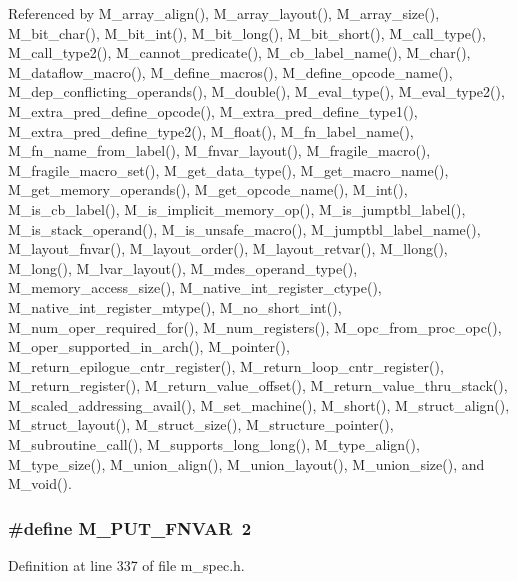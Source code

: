 Referenced by M\_\-array\_\-align(), M\_\-array\_\-layout(), M\_\-array\_\-size(), M\_\-bit\_\-char(), M\_\-bit\_\-int(), M\_\-bit\_\-long(), M\_\-bit\_\-short(), M\_\-call\_\-type(), M\_\-call\_\-type2(), M\_\-cannot\_\-predicate(), M\_\-cb\_\-label\_\-name(), M\_\-char(), M\_\-dataflow\_\-macro(), M\_\-define\_\-macros(), M\_\-define\_\-opcode\_\-name(), M\_\-dep\_\-conflicting\_\-operands(), M\_\-double(), M\_\-eval\_\-type(), M\_\-eval\_\-type2(), M\_\-extra\_\-pred\_\-define\_\-opcode(), M\_\-extra\_\-pred\_\-define\_\-type1(), M\_\-extra\_\-pred\_\-define\_\-type2(), M\_\-float(), M\_\-fn\_\-label\_\-name(), M\_\-fn\_\-name\_\-from\_\-label(), M\_\-fnvar\_\-layout(), M\_\-fragile\_\-macro(), M\_\-fragile\_\-macro\_\-set(), M\_\-get\_\-data\_\-type(), M\_\-get\_\-macro\_\-name(), M\_\-get\_\-memory\_\-operands(), M\_\-get\_\-opcode\_\-name(), M\_\-int(), M\_\-is\_\-cb\_\-label(), M\_\-is\_\-implicit\_\-memory\_\-op(), M\_\-is\_\-jumptbl\_\-label(), M\_\-is\_\-stack\_\-operand(), M\_\-is\_\-unsafe\_\-macro(), M\_\-jumptbl\_\-label\_\-name(), M\_\-layout\_\-fnvar(), M\_\-layout\_\-order(), M\_\-layout\_\-retvar(), M\_\-llong(), M\_\-long(), M\_\-lvar\_\-layout(), M\_\-mdes\_\-operand\_\-type(), M\_\-memory\_\-access\_\-size(), M\_\-native\_\-int\_\-register\_\-ctype(), M\_\-native\_\-int\_\-register\_\-mtype(), M\_\-no\_\-short\_\-int(), M\_\-num\_\-oper\_\-required\_\-for(), M\_\-num\_\-registers(), M\_\-opc\_\-from\_\-proc\_\-opc(), M\_\-oper\_\-supported\_\-in\_\-arch(), M\_\-pointer(), M\_\-return\_\-epilogue\_\-cntr\_\-register(), M\_\-return\_\-loop\_\-cntr\_\-register(), M\_\-return\_\-register(), M\_\-return\_\-value\_\-offset(), M\_\-return\_\-value\_\-thru\_\-stack(), M\_\-scaled\_\-addressing\_\-avail(), M\_\-set\_\-machine(), M\_\-short(), M\_\-struct\_\-align(), M\_\-struct\_\-layout(), M\_\-struct\_\-size(), M\_\-structure\_\-pointer(), M\_\-subroutine\_\-call(), M\_\-supports\_\-long\_\-long(), M\_\-type\_\-align(), M\_\-type\_\-size(), M\_\-union\_\-align(), M\_\-union\_\-layout(), M\_\-union\_\-size(), and M\_\-void().
\subsubsection{\setlength{\rightskip}{0pt plus 5cm}\#define M\_\-PUT\_\-FNVAR~2}\label{m__spec_8h_4585a5402ec0b8203a3b48c6e4c7452d}




Definition at line 337 of file m\_\-spec.h.

